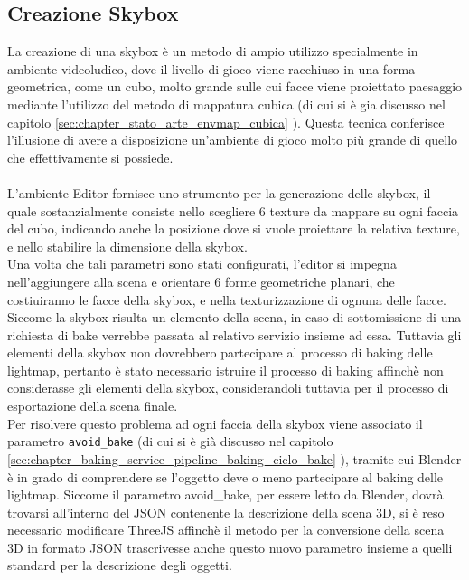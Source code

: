 \subsection{Creazione Skybox}
\label{sec:chapter_creazione_scena_funzionalita_editor_skybox}
La creazione di una skybox è un metodo di ampio utilizzo specialmente in ambiente videoludico, dove il livello di gioco viene racchiuso in una forma geometrica, come un cubo, molto grande sulle cui facce viene proiettato paesaggio mediante l’utilizzo del metodo di mappatura cubica (di cui si è gia discusso nel capitolo \ref{sec:chapter_stato_arte_envmap_cubica} ). Questa tecnica conferisce l’illusione di avere a disposizione un’ambiente di gioco molto più grande di quello che effettivamente si possiede.
\\
\\
L’ambiente Editor fornisce uno strumento per la generazione delle skybox, il quale sostanzialmente consiste nello scegliere 6 texture da mappare su ogni faccia del cubo, indicando anche la posizione dove si vuole proiettare la relativa texture, e nello stabilire la dimensione della skybox. 
\\
Una volta che tali parametri sono stati configurati, l’editor si impegna nell’aggiungere alla scena e orientare 6 forme geometriche planari, che costiuiranno le facce della skybox, e nella texturizzazione di ognuna delle facce.
\\
Siccome la skybox risulta un elemento della scena, in caso di sottomissione di una richiesta di bake verrebbe passata al relativo servizio insieme ad essa. Tuttavia gli elementi della skybox non dovrebbero partecipare al processo di baking delle lightmap, pertanto è stato necessario istruire il processo di baking affinchè non considerasse gli elementi della skybox, considerandoli tuttavia per il processo di esportazione della scena finale.
\\
Per risolvere questo problema ad ogni faccia della skybox viene associato il parametro \texttt{avoid\_bake} (di cui si è già discusso nel capitolo \ref{sec:chapter_baking_service_pipeline_baking_ciclo_bake} ), tramite cui Blender è in grado di comprendere se l’oggetto deve o meno partecipare al baking delle lightmap. Siccome il parametro avoid\_bake, per essere letto da Blender, dovrà trovarsi all’interno del JSON contenente la descrizione della scena 3D, si è reso necessario modificare ThreeJS affinchè il metodo per la conversione della scena 3D in formato JSON trascrivesse anche questo nuovo parametro insieme a quelli standard per la descrizione degli oggetti. 
